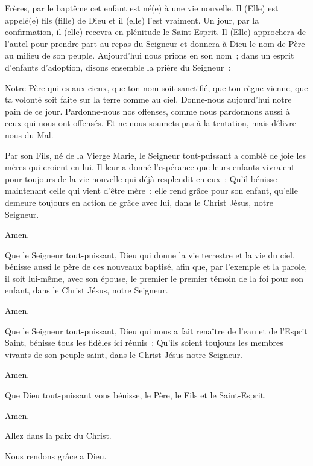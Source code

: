 \pars{}


Frères, par le baptême cet enfant est né(e) à une vie nouvelle.
Il (Elle) est appelé(e) fils (fille) de Dieu et il (elle) l'est vraiment.
Un jour, par la confirmation, il (elle) recevra en plénitude le Saint-Esprit.
Il (Elle) approchera de l'autel pour prendre part au repas du Seigneur
et donnera à Dieu le nom de Père au milieu de son peuple.
Aujourd'hui nous prions en son nom~; dans un esprit d'enfants d'adoption,
disons ensemble la prière du Seigneur~:

Notre Père qui es aux cieux,
que ton nom soit sanctifié,
que ton règne vienne,
que ta volonté soit faite sur la terre comme au ciel.
Donne-nous aujourd'hui notre pain de ce jour.
Pardonne-nous nos offenses,
comme nous pardonnons aussi à ceux qui nous ont offensés.
Et ne nous soumets pas à la tentation,
mais délivre-nous du Mal.

\pars{}


Par son Fils, né de la Vierge Marie, le Seigneur tout-puissant
a comblé de joie les mères qui croient en lui. Il leur a donné l'espérance
que leurs enfants vivraient pour toujours de la vie nouvelle qui déjà
resplendit en eux~; Qu'il bénisse maintenant celle qui vient d'être
mère~: elle rend grâce pour son enfant, qu'elle demeure toujours en
action de grâce avec lui, dans le Christ Jésus, notre Seigneur.

 Amen.

 Que le Seigneur tout-puissant, Dieu qui donne
la vie terrestre et la vie du ciel, bénisse aussi le père de ces nouveaux
baptisé, afin que, par l'exemple et la parole, il soit lui-même, avec son
épouse, le premier le premier témoin de la foi pour son enfant, dans le
Christ Jésus, notre Seigneur.

 Amen.

 Que le Seigneur tout-puissant, Dieu qui nous a fait
renaître de l'eau et de l'Esprit Saint, bénisse tous les fidèles ici réunis~:
Qu'ils soient toujours les membres vivants de son peuple saint, dans le
Christ Jésus notre Seigneur.

 Amen.

 Que Dieu tout-puissant vous bénisse,
le Père, le Fils \grecross{} et le Saint-Esprit.

 Amen.

 Allez dans la paix du Christ.

 Nous rendons grâce a Dieu.
